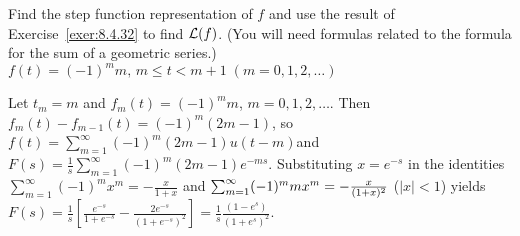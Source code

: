 \documentclass{ximera}
\begin{document}
\begin{problem}\label{exer:8.4.36}
 Find the step
function representation of $f$ and use the result of
Exercise~\ref{exer:8.4.32} to find ${\cal L}(f)$. (You will need
formulas related to the formula for the sum of a geometric series.)
$f(t)=(-1)^mm,\,m\le t<m+1\; (m=0,1,2,\dots)$

\begin{solution}
Let $t_m=m$ and $f_m(t)=(-1)^mm$, $m=0,1,2,\dots$.
Then $f_m(t)-f_{m-1}(t)=(-1)^m(2m-1)$, so
$f(t)=\sum_{m=1}^\infty(-1)^m(2m-1)u(t-m)$and
$F(s)=\frac{1}{s}\sum_{m=1}^\infty(-1)^m(2m-1)e^{-ms}$.
Substituting $x=e^{-s}$ in the identities $\sum_{m=1}^\infty
(-1)^mx^m=-\frac{x}{1+x}$ and $\sum_{m=1}^\infty
(-1)^mmx^m=-{x\over(1+x)^2}$
($|x|<1$) yields
$F(s)=\frac{1}{s}\left[\frac{e^{-s}}{1+e^{-s}}-\frac{2e^{-s}}{(1+e^{-s})^2}\right]=
\frac{1}{s}\frac{(1-e^s)}{(1+e^s)^2}$.
\end{solution}
\end{problem}
\end{document}
